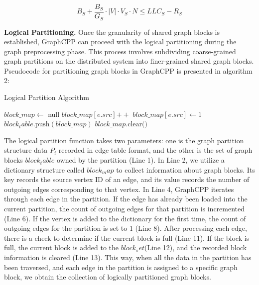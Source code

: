 \documentclass[lettersize,journal]{IEEEtran} %
\begin{document}
\begin{equation}
    B_S + \frac{B_S}{G_S} \cdot \lvert V \rvert \cdot V_S \cdot N \leq LLC_S - R_S
    \end{equation}

{\bf{Logical Partitioning.}} Once the granularity of shared graph blocks is established, GraphCPP can proceed with the logical partitioning during the graph preprocessing phase. This process involves subdividing coarse-grained graph partitions on the distributed system into finer-grained shared graph blocks. Pseudocode for partitioning graph blocks in GraphCPP is presented in algorithm 2:

\begin{algorithm}
\caption{Logical Partition Algorithm}
\begin{algorithmic}[1]
 
    \State $block\_map \gets$ null
      
            \State $block\_map[e.src] \mathrel{+{+}}$
        \Else
            \State $block\_map[e.src] \gets 1$
        \EndIf
            \State $block_table.\text{push}(block\_map)$
            \State $block\_map.\text{clear()}$
        \EndIf
    \EndFor
\EndFunction
\end{algorithmic}
\end{algorithm}

The logical partition function takes two parameters: one is the graph partition structure data $P_i$ recorded in edge table format, and the other is the set of graph blocks $block_table$ owned by the partition (Line 1). In Line 2, we utilize a dictionary structure called $block_map$ to collect information about graph blocks. Its key records the source vertex ID of an edge, and its value records the number of outgoing edges corresponding to that vertex. In Line 4, GraphCPP iterates through each edge in the partition. If the edge has already been loaded into the current partition, the count of outgoing edges for that partition is incremented (Line 6). If the vertex is added to the dictionary for the first time, the count of outgoing edges for the partition is set to 1 (Line 8). After processing each edge, there is a check to determine if the current block is full (Line 11). If the block is full, the current block is added to the $block_set $(Line 12), and the recorded block information is cleared (Line 13). This way, when all the data in the partition has been traversed, and each edge in the partition is assigned to a specific graph block, we obtain the collection of logically partitioned graph blocks.
\end{document}
